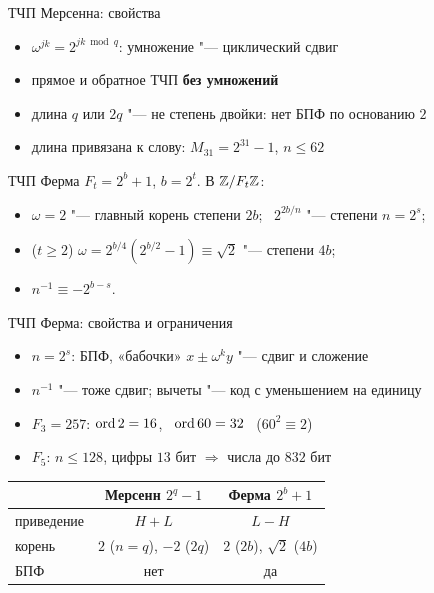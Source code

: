 \documentclass{ca-slides}
\begin{document}
\begin{canvasframe}{ТЧП Мерсенна: свойства}
  \begin{itemize}
    \item $\omega^{jk} = 2^{jk \bmod q}$: умножение "--- циклический сдвиг
    \item прямое и обратное ТЧП \textbf{без умножений}
    \item длина $q$ или $2q$ "--- не степень двойки: нет БПФ по основанию $2$
    \item длина привязана к слову: $M_{31} = 2^{31} - 1$, $n \le 62$
  \end{itemize}
\end{canvasframe}

\begin{theoremframe}{ТЧП Ферма}
  $F_t = 2^b + 1$, $b = 2^t$. В $\mathbb{Z}/F_t\mathbb{Z}$:
  \begin{itemize}
    \item $\omega = 2$ "--- главный корень степени $2b$; \ $2^{2b/n}$ "--- степени $n = 2^s$;
    \item ($t \ge 2$) $\omega = 2^{b/4}(2^{b/2} - 1) \equiv \sqrt 2$ "--- степени $4b$;
    \item $n^{-1} \equiv -2^{b - s}$.
  \end{itemize}
\end{theoremframe}

\begin{canvasframe}{ТЧП Ферма: свойства и ограничения}
  \small
  \begin{itemize}
    \item $n = 2^s$: БПФ, «бабочки» $x \pm \omega^k y$ "--- сдвиг и сложение
    \item $n^{-1}$ "--- тоже сдвиг; вычеты "--- код с уменьшением на единицу
    \item $F_3 = 257$: $\operatorname{ord} 2 = 16$, \ $\operatorname{ord} 60 = 32$ \ ($60^2 \equiv 2$)
    \item $F_5$: $n \le 128$, цифры $13$ бит $\Rightarrow$ числа до $832$ бит
  \end{itemize}
  \medskip
  \begin{tabular}{l|c|c}
    & Мерсенн $2^q - 1$ & Ферма $2^b + 1$ \\ \hline
    приведение & $H + L$ & $L - H$ \\
    корень & $2$ ($n = q$), $-2$ ($2q$) & $2$ ($2b$), $\sqrt2$ ($4b$) \\
    БПФ & нет & да \\
  \end{tabular}
\end{canvasframe}
\end{document}
